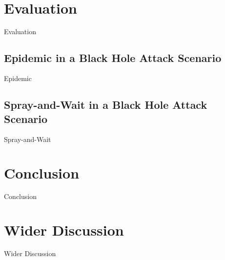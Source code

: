 \documentclass{article}
\begin{document}
\section{Evaluation}
Evaluation

\subsection{Epidemic in a Black Hole Attack Scenario}
Epidemic

\subsection{Spray-and-Wait in a Black Hole Attack Scenario}
Spray-and-Wait

\section{Conclusion}
Conclusion

\section{Wider Discussion}
Wider Discussion
\end{document}
